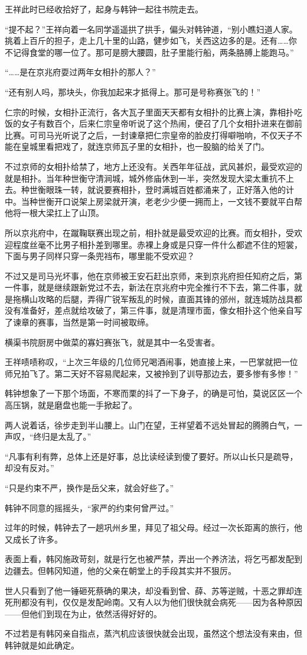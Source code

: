 王祥此时已经收拾好了，起身与韩钟一起往书院走去。

“提不起？”王祥向着一名同学遥遥拱了拱手，偏头对韩钟道，“别小瞧妇道人家。挑着上百斤的担子，走上几十里的山路，健步如飞，关西这边多的是。还有……你不记得食堂的哪一位了。那可是膀大腰圆，肚子里能行船，两条胳膊上能跑马。”

“……是在京兆府耍过两年女相扑的那人？”

“还有别人吗，那块头，你我加起来才抵得上。那可是号称赛张飞的！”

仁宗的时候，女相扑正流行，各大瓦子里面天天都有女相扑的比赛上演，靠相扑吃饭的女子有数百个，后来仁宗皇帝听说了这个热闹，便召了几个女相扑进来在御前比赛。可司马光听说了之后，一封谏章把仁宗皇帝的脸皮打得噼啪响，不仅天子不能在皇城里看把戏了，就连京师瓦子里的女相扑，也一股脑的给关了门。

不过京师的女相扑给禁了，地方上还没有。关西年年征战，武风甚炽，最受欢迎的就是相扑。当年种世衡守清涧城，城外修庙休到一半，突然发现大梁太重抗不上去。种世衡眼珠一转，就说要赛相扑，登时满城百姓都涌来了，正好落入他的计中。当种世衡开口说架上房梁就开演，老老少少便一拥而上，一文钱不要就平白帮他将一根大梁扛上了山顶。

所以京兆府中，在蹴鞠联赛出现之前，相扑就是最受欢迎的比赛。而女相扑，受欢迎程度丝毫不比男子相扑差到哪里。赤裸上身或是只穿一件什么都遮不住的短裳，下面与男子同样只穿一条兜裆布，哪里能不受欢迎？

不过又是司马光坏事，他在京师被王安石赶出京师，来到京兆府担任知府之后，第一件事，就是继续跟新党过不去，新法在京兆府中完全推行不下去，第二件事，就是拖横山攻略的后腿，弄得广锐军叛乱的时候，直面其锋的邠州，就连城防战具都没有准备好，差点就给攻破了，第三件事，就是清理市面，像女相扑这个他亲自写了谏章的赛事，当然是第一时间被取缔。

横渠书院厨房中做菜的寡妇赛张飞，就是其中一名受害者。

王祥啧啧称叹，“上次三年级的几位师兄喝酒闹事，她直接上来，一巴掌就把一位师兄拍飞了。第二天好不容易爬起来，又被拎到了训导那边去，要多惨有多惨！”

韩钟想象了一下那个场面，不寒而栗的抖了一下身子，的确是可怕，莫说区区一个高压锅，就是磨盘也能一手掀起了。

两人说着话，徐步走到半山腰上。山门在望，王祥望着不远处冒起的腾腾白气，一声叹，“终归是太乱了。”

“凡事有利有弊，总体上还是好事，总比读经读到傻了要好。所以山长只是疏导，却没有反对。”

“只是约束不严，换作是岳父来，就会好些了。”

韩钟不同意的摇摇头，“家严的约束何曾严过。”

过年的时候，韩钟去了一趟巩州乡里，拜见了祖父母。经过一次长距离的旅行，他又成长了许多。

表面上看，韩冈施政苛刻，就是行乞也被严禁，弄出一个养济法，将乞丐都发配到边疆去。但韩冈知道，他的父亲在朝堂上的手段其实并不狠厉。

世人只看到了他一锤砸死蔡确的果决，却没看到曾、薛、苏等逆贼，十恶之罪却连死刑都没有判，仅仅是发配岭南。又有人以为他们很快就会病死——因为各种原因——但他们到现在为止，依然活得好好的。

不过若是有韩冈亲自指点，蒸汽机应该很快就会出现，虽然这个想法没有来由，但韩钟就是如此确定。
